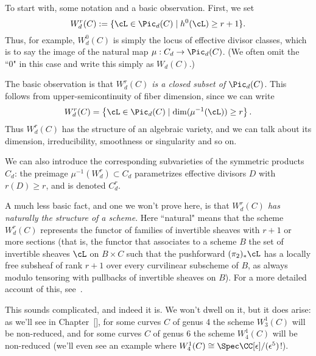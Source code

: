 To start with, some notation and a basic observation. First, we set
$$
W^r_d(C) := \{ \cL \in \Pic_d(C) \mid h^0(\cL) \geq r+1 \}.
$$
Thus, for example, $W^0_d(C)$ is simply the locus of effective divisor classes, which is to say the image of the natural map $\mu : C_d \to \Pic_d(C)$. (We often omit the ``0" in this case and write this simply as $W_d(C)$.)

The basic observation is that \emph{$W^r_d(C)$ is a closed subset of $\Pic_d(C)$}. This follows from upper-semicontinuity of fiber dimension, since we can write
$$
W^r_d(C) = \left\{ \cL \in \Pic_d(C) \mid \dim(\mu^{-1}(\cL)) \geq r \right\}.
$$
Thus $W^r_d(C)$ has the structure of an algebraic variety, and we can talk about its dimension, irreducibility, smoothness or singularity and so on.

We can also introduce the corresponding subvarieties of the symmetric products $C_d$: the preimage $\mu^{-1}(W^r_d) \subset C_d$ parametrizes effective divisors $D$ with $r(D) \geq r$, and is denoted $C^r_d$.

A much less basic fact, and one we won't prove here, is that \emph{$W^r_d(C)$ has naturally the structure of a scheme}. Here ``natural" means that the scheme $W^r_d(C)$ represents the functor of families of invertible sheaves with $r+1$ or more sections (that is, the functor that associates to a scheme $B$ the set of invertible sheaves $\cL$ on $B \times C$ such that the pushforward $(\pi_2)_*\cL$ has a locally free subsheaf of rank $r+1$ over every curvilinear subscheme of $B$, as always modulo tensoring with pullbacks of invertible sheaves on $B$). For a more detailed account of this, see~\cite{ACGH}.

This sounds complicated, and indeed it is. We won't  dwell on it, but it does arise: as we'll see in Chapter~\ref{}, for some curves $C$ of genus 4 the scheme $W^1_3(C)$ will be non-reduced, and for some curves $C$ of genus 6 the scheme $W^1_4(C)$ will be non-reduced (we'll even see an example where $W^1_4(C) \cong \Spec \CC[\epsilon]/(\epsilon^5)$!). 

